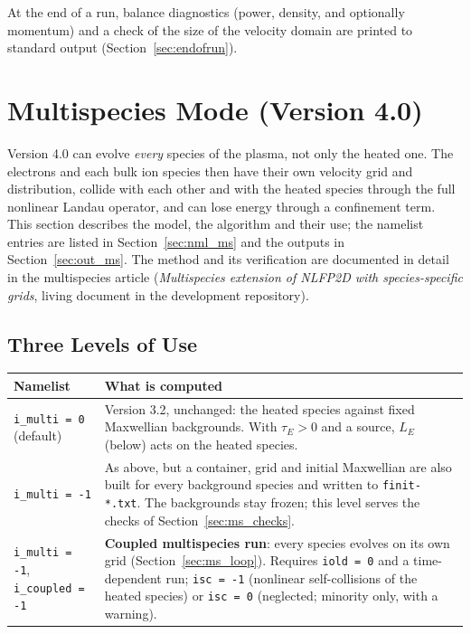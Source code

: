\documentclass[11pt,a4paper]{article}
\begin{document}
At the end of a run, balance diagnostics (power, density, and optionally
momentum) and a check of the size of the velocity domain are printed to
standard output (Section~\ref{sec:endofrun}).

\section{Multispecies Mode (Version 4.0)}
\label{sec:ms}

Version 4.0 can evolve \emph{every} species of the plasma, not only the heated one. The electrons
and each bulk ion species then have their own velocity grid and distribution, collide with each
other and with the heated species through the full nonlinear Landau operator, and can lose energy
through a confinement term. This section describes the model, the algorithm and their use; the
namelist entries are listed in Section~\ref{sec:nml_ms} and the outputs in
Section~\ref{sec:out_ms}. The method and its verification are documented in detail in the
multispecies article (\emph{Multispecies extension of NLFP2D with species-specific grids}, living
document in the development repository).

\subsection{Three Levels of Use}

\begin{longtable}{>{\raggedright}p{4.2cm} p{10.4cm}}
\toprule
Namelist & What is computed\\\midrule
\endhead
\bottomrule
\endlastfoot
\texttt{i\_multi = 0} (default) & Version 3.2, unchanged: the heated species against fixed Maxwellian
  backgrounds.  With $\tau_E>0$ and a source, $L_E$ (below) acts on the heated species. \\[3pt]
\texttt{i\_multi = -1} & As above, but a container, grid and initial Maxwellian are also built for
  every background species and written to \texttt{finit-*.txt}.  The backgrounds stay frozen; this
  level serves the checks of Section~\ref{sec:ms_checks}. \\[3pt]
\texttt{i\_multi = -1}, \texttt{i\_coupled = -1} & \textbf{Coupled multispecies run}: every species
  evolves on its own grid (Section~\ref{sec:ms_loop}).  Requires \texttt{iold = 0} and a
  time-dependent run; \texttt{isc = -1} (nonlinear self-collisions of the heated species) or
  \texttt{isc = 0} (neglected; minority only, with a warning). \\
\end{longtable}
\end{document}
